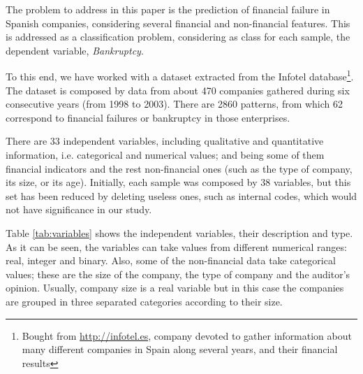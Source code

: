 \documentclass[a4paper,10pt,onecolumn,preprint,3p]{elsarticle}
\begin{document}
The problem to address in this paper is the prediction of financial failure in Spanish companies, considering several financial and non-financial features.
This is addressed as a classification problem, considering as class for each sample, the dependent variable, \textit{Bankruptcy}.

To this end, we have worked with a dataset extracted from the Infotel database\footnote{Bought from \url{http://infotel.es}, company devoted to gather information about many different companies in Spain along several years, and their financial results}. 
The dataset is composed by data from about 470 companies gathered during six consecutive years (from 1998 to 2003). There are 2860 patterns, from which 62 correspond to financial failures or bankruptcy in those enterprises.


There are 33 independent variables, including qualitative and quantitative information, i.e. categorical and numerical values; and being some of them financial indicators and the rest non-financial ones (such as the type of company, its size, or its age). 
Initially, each sample was composed by 38 variables, but this set has been reduced by deleting useless ones, such as internal codes, which would not have significance in our study.

Table \ref{tab:variables} shows the independent variables, their description and type. As it can be seen, the variables can take values from different numerical ranges: real, integer and binary. Also, some of the non-financial data take categorical values; these are the size of the company, the type of company and the auditor's opinion. Usually, company size is a real variable but in this case the companies are grouped in three separated categories according to their size. 
\end{document}
